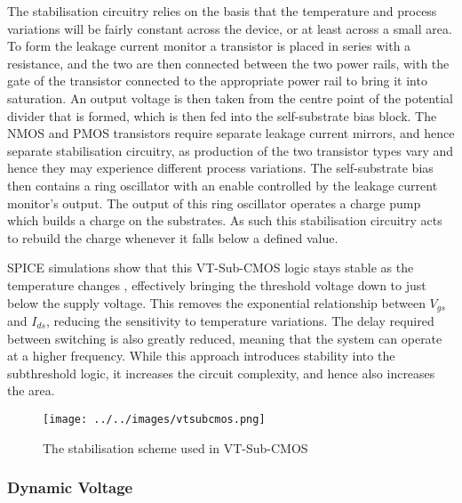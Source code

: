 The stabilisation circuitry relies on the basis that the temperature and process variations will be fairly constant across the device, or at least across a small area.
To form the leakage current monitor a transistor is placed in series with a resistance, and the two are then connected between the two power rails, with the gate of the transistor connected to the appropriate power rail to bring it into saturation.
An output voltage is then taken from the centre point of the potential divider that is formed, which is then fed into the self-substrate bias block.
The NMOS and PMOS transistors require separate leakage current mirrors, and hence separate stabilisation circuitry, as production of the two transistor types vary and hence they may experience different process variations.
The self-substrate bias then contains a ring oscillator with an enable controlled by the leakage current monitor's output.
The output of this ring oscillator operates a charge pump which builds a charge on the substrates.
As such this stabilisation circuitry acts to rebuild the charge whenever it falls below a defined value.

SPICE simulations show that this VT-Sub-CMOS logic stays stable as the temperature changes \cite{IEEEVLSIRobustSTL}, effectively bringing the threshold voltage down to just below the supply voltage.
This removes the exponential relationship between $V_{gs}$ and $I_{ds}$, reducing the sensitivity to temperature variations.
The delay required between switching is also greatly reduced, meaning that the system can operate at a higher frequency.
While this approach introduces stability into the subthreshold logic, it increases the circuit complexity, and hence also increases the area.

\begin{figure}
	\centering
	\texttt{[image: ../../images/vtsubcmos.png]}
	\caption{The stabilisation scheme used in VT-Sub-CMOS \cite{IEEEVLSIRobustSTL}}
	\label{fig:vtsubcmos}
\end{figure}

\subsubsection{Dynamic Voltage}

